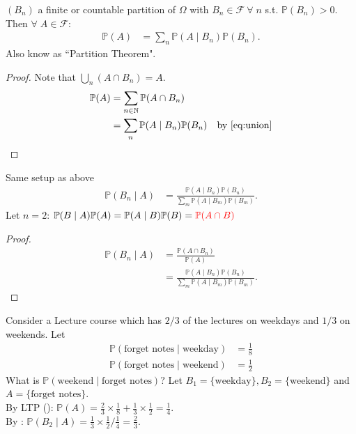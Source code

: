 \begin{theorem} \label{thm:ltp}
    $(B_n)$ a finite or countable partition of $\Omega$ with $B_n \in \mathcal{F} \ \forall \; n$ s.t. $\mathbb{P}(B_n) > 0$.
    Then $\forall \; A \in \mathcal{F}$:
    \begin{align*}
        \mathbb{P}(A) &= \sum_n \mathbb{P}(A \mid B_n) \mathbb{P}(B_n).
    \end{align*}  
    Also know as ``Partition Theorem".
\end{theorem} 

\begin{proof}
    Note that $\bigcup_n \left(A \cap B_n \right) = A$.
    \begin{align*}
        \mathbb{P}(A) &= \sum_{n \in \mathbb{N}} \mathbb{P}(A \cap B_n) \\
        &= \sum_n \mathbb{P}(A \mid B_n) \mathbb{P}(B_n) \quad \text{by \Cref{eq:union}}
    \end{align*} 
\end{proof} 

\begin{theorem} \label{thm:bayes}
    Same setup as above
    \begin{align*}
        \mathbb{P}(B_n \mid A) &= \frac{\mathbb{P}(A \mid B_n) \mathbb{P}(B_n)}{\sum_m \mathbb{P}(A \mid B_m) \mathbb{P}(B_m)}.
    \end{align*} 
    Let $n = 2$: $\mathbb{P}(B \mid A) \mathbb{P}(A) = \mathbb{P}(A \mid B) \mathbb{P}(B) = \mathcolor{red}{\mathbb{P}(A \cap B)}$
\end{theorem} 

\begin{proof}
    \begin{align*}
        \mathbb{P}(B_n \mid A) &= \frac{\mathbb{P}(A \cap B_n)}{\mathbb{P}(A)} \\
        &= \frac{\mathbb{P}(A \mid B_n) \mathbb{P}(B_n)}{\sum_m \mathbb{P}(A \mid B_m) \mathbb{P}(B_m)}.
    \end{align*} 
\end{proof} 

\begin{example}
    Consider a Lecture course which has $2 / 3$ of the lectures on weekdays and $1 / 3$ on weekends.
    Let 
    \begin{align*}
        \mathbb{P}(\text{forget notes} \mid \text{weekday}) &= \frac{1}{8} \\
        \mathbb{P}(\text{forget notes} \mid \text{weekend}) &= \frac{1}{2}
    \end{align*} 
    What is $\mathbb{P}(\text{weekend} \mid \text{forget notes})$?
    Let $B_1 = \{\text{weekday}\}, B_2 = \{ \text{weekend} \}$ and $A = \{\text{forget notes}\}$. \\
    By LTP (): $\mathbb{P}(A) = \frac{2}{3} \times \frac{1}{8} + \frac{1}{3} \times \frac{1}{2} = \frac{1}{4}$. \\
    By : $\mathbb{P}(B_2 \mid A) = \frac{1}{3} \times \frac{1}{2} / \frac{1}{4} = \frac{2}{3}$.
\end{example}


